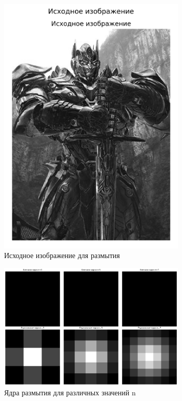 \begin{figure}[H]
    \centering
    \includegraphics[width=0.8\textwidth]{images/task2/original_image.png}
    \caption{Исходное изображение для размытия}
    \label{fig:original_blur}
\end{figure}

\begin{figure}[H]
    \centering
    \includegraphics[width=0.8\textwidth]{images/task2/blur_kernels.png}
    \caption{Ядра размытия для различных значений n}
    \label{fig:blur_kernels}
\end{figure}

